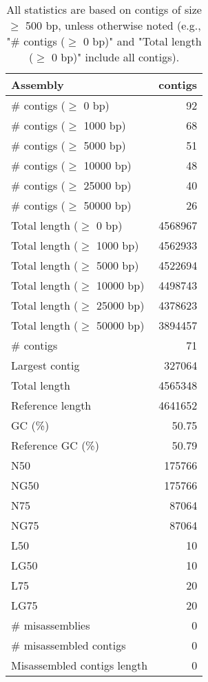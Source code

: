 \documentclass[12pt,a4paper]{article}
\begin{document}
\begin{table}[ht]
\begin{center}
\caption{All statistics are based on contigs of size $\geq$ 500 bp, unless otherwise noted (e.g., "\# contigs ($\geq$ 0 bp)" and "Total length ($\geq$ 0 bp)" include all contigs).}
\begin{tabular}{|l*{1}{|r}|}
\hline
Assembly & contigs \\ \hline
\# contigs ($\geq$ 0 bp) & 92 \\ \hline
\# contigs ($\geq$ 1000 bp) & 68 \\ \hline
\# contigs ($\geq$ 5000 bp) & 51 \\ \hline
\# contigs ($\geq$ 10000 bp) & 48 \\ \hline
\# contigs ($\geq$ 25000 bp) & 40 \\ \hline
\# contigs ($\geq$ 50000 bp) & 26 \\ \hline
Total length ($\geq$ 0 bp) & 4568967 \\ \hline
Total length ($\geq$ 1000 bp) & 4562933 \\ \hline
Total length ($\geq$ 5000 bp) & 4522694 \\ \hline
Total length ($\geq$ 10000 bp) & 4498743 \\ \hline
Total length ($\geq$ 25000 bp) & 4378623 \\ \hline
Total length ($\geq$ 50000 bp) & 3894457 \\ \hline
\# contigs & 71 \\ \hline
Largest contig & 327064 \\ \hline
Total length & 4565348 \\ \hline
Reference length & 4641652 \\ \hline
GC (\%) & 50.75 \\ \hline
Reference GC (\%) & 50.79 \\ \hline
N50 & 175766 \\ \hline
NG50 & 175766 \\ \hline
N75 & 87064 \\ \hline
NG75 & 87064 \\ \hline
L50 & 10 \\ \hline
LG50 & 10 \\ \hline
L75 & 20 \\ \hline
LG75 & 20 \\ \hline
\# misassemblies & 0 \\ \hline
\# misassembled contigs & 0 \\ \hline
Misassembled contigs length & 0 \\ \hline

\end{tabular}
\end{center}
\end{table}
\end{document}
